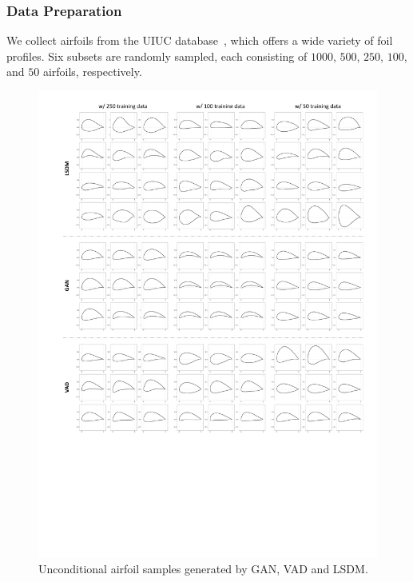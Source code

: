 \subsubsection{Data Preparation}
We collect airfoils from the UIUC database~\cite{aa.Selig1996}, which offers a wide variety of foil profiles. Six subsets are randomly sampled, each consisting of $1000$, $500$, $250$, $100$, and $50$ airfoils, respectively.


\begin{figure}[!t]
    \begin{center}
        \includegraphics[width=1\linewidth]{chapter6/fig/fig_uncon_airfoils_updated.pdf}
    \end{center}
    \caption{
        \small Unconditional airfoil samples generated by GAN, VAD and LSDM.
    }
    \label{ch6:fig:main_unconditional_airfoils}
\end{figure}

